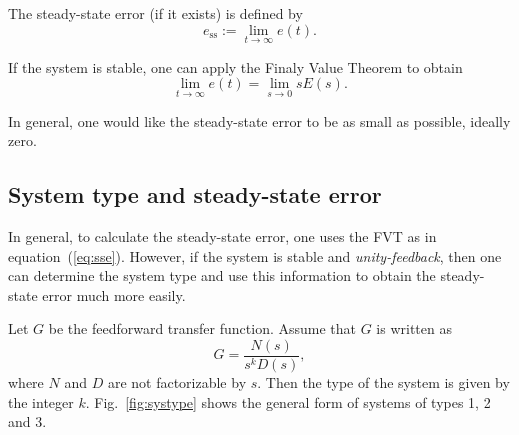 \documentclass[a4paper,11pt]{report}
\newcommand{\sse}{\mathrm{ss}}
\begin{document}
The steady-state error (if it exists) is defined by
\begin{equation}
	\label{eq:sse}
	e_\sse := \lim_{t\to\infty} e(t).
\end{equation}

If the system is stable, one can apply the Finaly Value Theorem to obtain
\[
\lim_{t\to\infty} e(t) = \lim_{s\to 0} sE(s).
\]

In general, one would like the steady-state error to be as small as
possible, ideally zero.

\subsection{System type and steady-state error}

In general, to calculate the steady-state error, one uses the FVT as
in equation~(\ref{eq:sse}). However, if the system is stable and
\emph{unity-feedback}, then one can determine the system type and use
this information to obtain the steady-state error much more easily.

Let $G$ be the feedforward transfer function. Assume that $G$ is
written as
\[
G=\frac{N(s)}{s^kD(s)},
\]
where $N$ and $D$ are not factorizable by $s$. Then the type of the
system is given by the integer $k$. Fig.~\ref{fig:systype} shows the
general form of systems of types 1, 2 and 3.
\end{document}
